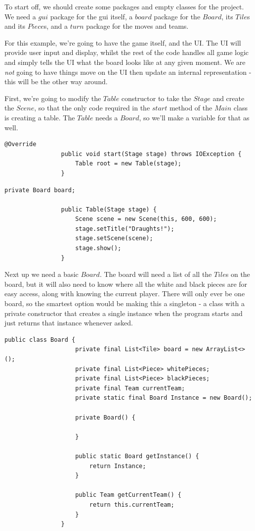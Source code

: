 \documentclass[a4paper]{report}
\begin{document}
			To start off, we should create some packages and empty classes for the project. We need a $gui$ package for the gui itself, a $board$ package for the $Board$, its $Tile$s and its $Piece$s, and a $turn$ package for the moves and teams.
			
			For this example, we're going to have the game itself, and the UI. The UI will provide user input and display, whilst the rest of the code handles all game logic and simply tells the UI what the board looks like at any given moment. We are \textit{not} going to have things move on the UI then update an internal representation - this will be the other way around.
			
			First, we're going to modify the $Table$ constructor to take the $Stage$ and create the $Scene$, so that the only code required in the $start$ method of the $Main$ class is creating a table. The $Table$ needs a $Board$, so we'll make a variable for that as well.
			
			\begin{lstlisting}[frame=top, caption=Main.Java]
				@Override
				public void start(Stage stage) throws IOException {
					Table root = new Table(stage);
				}
			\end{lstlisting}
			
			\begin{lstlisting}[frame=top, caption=Table.Java]
				private Board board;
				
				public Table(Stage stage) {
					Scene scene = new Scene(this, 600, 600);
					stage.setTitle("Draughts!");
					stage.setScene(scene);
					stage.show();
				}
			\end{lstlisting} \bigskip
			
			Next up we need a basic $Board$. The board will need a list of all the $Tile$s on the board, but it will also need to know where all the white and black pieces are for easy access, along with knowing the current player. There will only ever be one board, so the smartest option would be making this a singleton - a class with a private constructor that creates a single instance when the program starts and just returns that instance whenever asked.
			
			\begin{lstlisting}[frame=top, caption=Board.java]
				public class Board {
					private final List<Tile> board = new ArrayList<>();
					private final List<Piece> whitePieces;
					private final List<Piece> blackPieces;
					private final Team currentTeam;
					private static final Board Instance = new Board();
					
					private Board() {
						
					}
					
					public static Board getInstance() {
						return Instance;
					}
					
					public Team getCurrentTeam() {
						return this.currentTeam;
					}
				}
			\end{lstlisting} \bigskip
			
\end{document}
